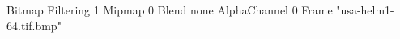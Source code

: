 {Bitmap
	{Filtering 1}
	{Mipmap 0}
	{Blend none}
	{AlphaChannel 0}
	{Frame "usa-helm1-64.tif.bmp"}
}
